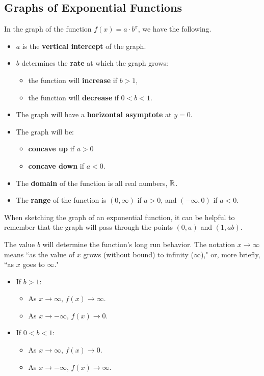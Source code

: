 \subsection{Graphs of Exponential Functions}
\label{ssec:graphs-exp}

\begin{theorem}
In the graph of the function $f(x) = a\cdot b^x$, we have the following.

\begin{itemize}
  \item $a$ is the {\bf vertical intercept} of the graph.
  \item $b$ determines the {\bf rate} at which the graph grows:
  \begin{itemize}
      \item the function will {\bf increase} if $b>1$,
      \item the function will {\bf decrease} if $0<b<1$.
  \end{itemize}
  \item The graph will have a {\bf horizontal asymptote} at $y=0$.
  \item The graph will be:
  \begin{itemize}
    \item {\bf concave up} if $a>0$
    \item {\bf concave down} if $a<0$.
  \end{itemize}
  \item The {\bf domain} of the function is all real numbers, $\mathbb{R}$.
  \item The {\bf range} of the function is $(0,\infty)$ if $a>0$, and $(-\infty,0)$ if $a<0$.
\end{itemize}
\end{theorem}

When sketching the graph of an exponential function, it can be helpful to remember that the graph will pass through the points $(0,a)$ and $(1, ab)$.

\begin{theorem}
The value $b$ will determine the function's long run behavior. The notation $x\to\infty$ means ``as the value of $x$ grows (without bound) to infinity ($\infty$)," or, more briefly, ``as $x$ goes to $\infty$."
\begin{itemize}
  \item If $b>1$:
  \begin{itemize}
    \item As $x\rightarrow\infty$, $f(x)\rightarrow\infty$.
    \item As $x\rightarrow-\infty$, $f(x)\rightarrow 0$.
  \end{itemize}
  \item If $0<b<1$:
  \begin{itemize}
    \item As $x\rightarrow\infty$, $f(x)\rightarrow 0$.
    \item As $x\rightarrow-\infty$, $f(x)\rightarrow\infty$.
  \end{itemize}
\end{itemize}
\end{theorem}

